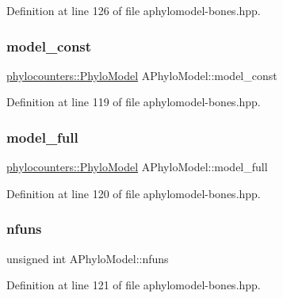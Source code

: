 Definition at line 126 of file aphylomodel-\/bones.\+hpp.

\mbox{\label{class_a_phylo_model_ad91e946cad1e96aa444b586921d1ebe6}} 
\subsubsection{\texorpdfstring{model\+\_\+const}{model\_const}}
{\footnotesize\ttfamily \hyperlink{namespacebarry_1_1counters_1_1phylo_ad32b4186e3bab93119df225fddc3c609}{phylocounters\+::\+Phylo\+Model} A\+Phylo\+Model\+::model\+\_\+const}



Definition at line 119 of file aphylomodel-\/bones.\+hpp.

\mbox{\label{class_a_phylo_model_a79c9e748c657487a60497265348f8a14}} 
\subsubsection{\texorpdfstring{model\+\_\+full}{model\_full}}
{\footnotesize\ttfamily \hyperlink{namespacebarry_1_1counters_1_1phylo_ad32b4186e3bab93119df225fddc3c609}{phylocounters\+::\+Phylo\+Model} A\+Phylo\+Model\+::model\+\_\+full}



Definition at line 120 of file aphylomodel-\/bones.\+hpp.

\mbox{\label{class_a_phylo_model_a1abbdd05ac20bf7f0bdb0366190198a1}} 
\subsubsection{\texorpdfstring{nfuns}{nfuns}}
{\footnotesize\ttfamily unsigned int A\+Phylo\+Model\+::nfuns}



Definition at line 121 of file aphylomodel-\/bones.\+hpp.

\mbox{\label{class_a_phylo_model_af48d7223972ea6f74d2780b316db730e}} 
